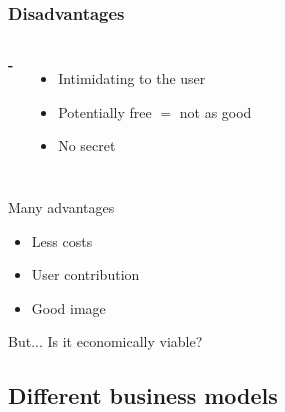 \documentclass{beamer}
\begin{document}
\begin{frame}

  \frametitle{Disadvantages}

  \begin{columns}

    \Huge{\textbf{-}}

    \begin{itemize}
      \item<2->{Intimidating to the user}
      \item<3->{Potentially free $=$ not as good}
      \item<4>{No secret}
    \end{itemize}

  \end{columns}

\end{frame}

\begin{frame}

  \begin{block}{Many advantages}
    \begin{itemize}
    \item{Less costs}
    \item{User contribution}
    \item{Good image}
    \end{itemize}
  \end{block}

  \vfill

  \begin{block}{But...}
    Is it economically viable?
  \end{block}

\end{frame}

\subsection{Different business models}
\end{document}
